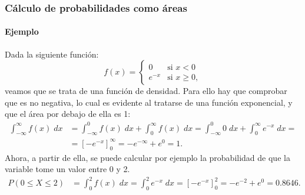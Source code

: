 \begin{frame}
\frametitle{Cálculo de probabilidades como áreas}
\framesubtitle{Ejemplo}
Dada la siguiente función:
\[
f(x) = 
\begin{cases}
0 & \mbox{si $x<0$}\\
e^{-x} & \mbox{si $x\geq 0$},
\end{cases}
\]
veamos que se trata de una función de densidad. Para ello hay que comprobar que es no negativa, lo cual es evidente al tratarse de una función exponencial, y que el área por debajo de ella es 1:
\begin{align*}
\int_{-\infty}^\infty f(x)\;dx &= \int_{-\infty}^0 f(x)\;dx +\int_0^\infty f(x)\;dx = \int_{-\infty}^0 0\;dx +\int_0^\infty e^{-x}\;dx =\\
&= \left[-e^{-x}\right]_0^{\infty} = -e^{-\infty}+e^0 = 1.
\end{align*}
Ahora, a partir de ella, se puede calcular por ejemplo la probabilidad de que la variable tome un valor entre 0 y 2.
\begin{align*}
P(0\leq X\leq 2) &= \int_0^2 f(x)\;dx = \int_0^2 e^{-x}\;dx = \left[-e^{-x}\right]_0^2 = -e^{-2}+e^0 = 0.8646. 
\end{align*}

\end{frame}


